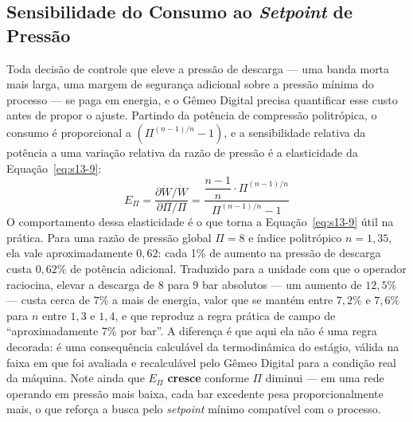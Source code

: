 \documentclass[12pt,a4paper]{article}
\numberwithin{equation}{section}
\numberwithin{table}{section}
\numberwithin{figure}{section}
\begin{document}
	\subsection{\textbf{Sensibilidade do Consumo ao \textit{Setpoint} de Pressão}}
	Toda decisão de controle que eleve a pressão de descarga — uma banda morta mais larga, uma margem de segurança adicional sobre a pressão mínima do processo — se paga em energia, e o Gêmeo Digital precisa quantificar esse custo antes de propor o ajuste. Partindo da potência de compressão politrópica, o consumo é proporcional a $\left(\Pi^{(n-1)/n} - 1\right)$, e a sensibilidade relativa da potência a uma variação relativa da razão de pressão é a elasticidade da Equação~\eqref{eq:s13-9}:
	\begin{equation}\label{eq:s13-9}
	E_{\Pi} = \frac{\partial \dot{W}/\dot{W}}{\partial \Pi/\Pi} = \frac{\dfrac{n-1}{n} \cdot \Pi^{(n-1)/n}}{\Pi^{(n-1)/n} - 1}
	\end{equation}
	O comportamento dessa elasticidade é o que torna a Equação~\eqref{eq:s13-9} útil na prática. Para uma razão de pressão global $\Pi = 8$ e índice politrópico $n = 1{,}35$, ela vale aproximadamente $0{,}62$: cada 1\% de aumento na pressão de descarga custa $0{,}62\%$ de potência adicional. Traduzido para a unidade com que o operador raciocina, elevar a descarga de $8$ para $9$ bar absolutos — um aumento de $12{,}5\%$ — custa cerca de $7\%$ a mais de energia, valor que se mantém entre $7{,}2\%$ e $7{,}6\%$ para $n$ entre $1{,}3$ e $1{,}4$, e que reproduz a regra prática de campo de ``aproximadamente 7\% por bar''. A diferença é que aqui ela não é uma regra decorada: é uma consequência calculável da termodinâmica do estágio, válida na faixa em que foi avaliada e recalculável pelo Gêmeo Digital para a condição real da máquina. Note ainda que $E_{\Pi}$ \textbf{cresce} conforme $\Pi$ diminui — em uma rede operando em pressão mais baixa, cada bar excedente pesa proporcionalmente mais, o que reforça a busca pelo \textit{setpoint} mínimo compatível com o processo.
\end{document}
